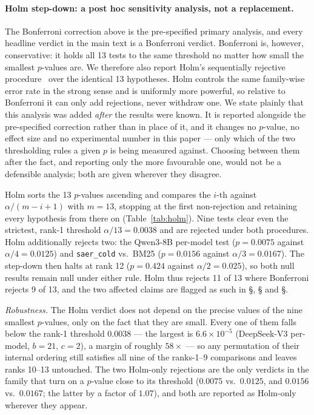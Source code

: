 \documentclass[letterpaper]{article} %
\newcommand{\bodyref}[1]{\getrefnumber{#1}}
\begin{document}
\paragraph{Holm step-down: a post hoc sensitivity analysis, not a
replacement.}  The Bonferroni correction above is the pre-specified
primary analysis, and every headline verdict in the main text is a
Bonferroni verdict.  Bonferroni is, however, conservative: it holds all
13 tests to the same threshold no matter how small the smallest
$p$-values are.  We therefore also report Holm's sequentially rejective
procedure~\citep{holm1979simple} over the identical 13 hypotheses.  Holm
controls the same family-wise error rate in the strong sense and is
uniformly more powerful, so relative to Bonferroni it can only add
rejections, never withdraw one.  We state plainly that this analysis was
added \emph{after} the results were known.  It is reported alongside the
pre-specified correction rather than in place of it, and it changes no
$p$-value, no effect size and no experimental number in this paper ---
only which of the two thresholding rules a given $p$ is being measured
against.  Choosing between them after the fact, and reporting only the
more favourable one, would not be a defensible analysis; both are given
wherever they disagree.

Holm sorts the 13 $p$-values ascending and compares the $i$-th against
$\alpha/(m{-}i{+}1)$ with $m{=}13$, stopping at the first
non-rejection and retaining every hypothesis from there on
(Table~\ref{tab:holm}).  Nine tests clear even the strictest, rank-1
threshold $\alpha/13{=}0.0038$ and are rejected under both procedures.
Holm additionally rejects two: the Qwen3-8B per-model test
($p{=}0.0075$ against $\alpha/4{=}0.0125$) and \texttt{saer\_cold} vs.\
BM25 ($p{=}0.0156$ against $\alpha/3{=}0.0167$).  The step-down then
halts at rank 12 ($p{=}0.424$ against $\alpha/2{=}0.025$), so both null
results remain null under either rule.  Holm thus rejects 11 of 13
where Bonferroni rejects 9 of 13, and the two affected claims are
flagged as such in \S\bodyref{sec:protocol}, \S\bodyref{sec:mainresults} and
\S\bodyref{sec:ablation}.

\emph{Robustness.}  The Holm verdict does not depend on the precise
values of the nine smallest $p$-values, only on the fact that they are
small.  Every one of them falls below the rank-1 threshold $0.0038$ ---
the largest is $6.6{\times}10^{-5}$ (DeepSeek-V3 per-model, $b{=}21$,
$c{=}2$), a margin of roughly $58\times$ --- so any permutation of their
internal ordering still satisfies all nine of the ranks-1--9
comparisons and leaves ranks 10--13 untouched.  The two Holm-only
rejections are the only verdicts in the family that turn on a $p$-value
close to its threshold ($0.0075$ vs.\ $0.0125$, and $0.0156$ vs.\
$0.0167$; the latter by a factor of $1.07$), and both are reported as
Holm-only wherever they appear.
\end{document}
